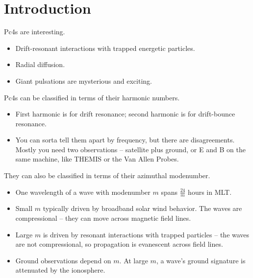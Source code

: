 \documentclass{article}
\newcommand{\azm}{\ensuremath{m}\xspace}
\begin{document}

\section{Introduction}

Pc4s are interesting.

\begin{itemize}
    \item Drift-resonant interactions with trapped energetic particles.
    \item Radial diffusion.
    \item Giant pulsations are mysterious and exciting.
\end{itemize}

Pc4s can be classified in terms of their harmonic numbers.

\begin{itemize}
    \item First harmonic is for drift resonance; second harmonic is for drift-bounce resonance\cite{dai_2013,poulter_1983}.
    \item You can sorta tell them apart by frequency, but there are disagreements\cite{takahashi_2013}. Mostly you need two observations -- satellite plus ground, or E and B on the same machine\cite{dai_2015}, like THEMIS\cite{angelopoulos_2008} or the Van Allen Probes\cite{stratton_2012}.
\end{itemize}

They can also be classified in terms of their azimuthal modenumber.

\begin{itemize}
    \item One wavelength of a wave with modenumber \azm spans $\frac{24}{\azm}$ hours in MLT.
    \item Small \azm typically driven by broadband solar wind behavior\cite{degeling_2014,hao_2014,zong_2009,chen_1974,liu_2011,southwood_1974}. The waves are compressional -- they can move across magnetic field lines.
    \item Large \azm is driven by resonant interactions with trapped particles -- the waves are not compressional, so propagation is evanescent across field lines\cite{cummings_1969,radoski_1974}.
    \item Ground observations depend on \azm. At large \azm, a wave's ground signature is attenuated by the ionosphere\cite{hughes_1976,wright_1999,yeoman_2001}.
\end{itemize}
\end{document}
